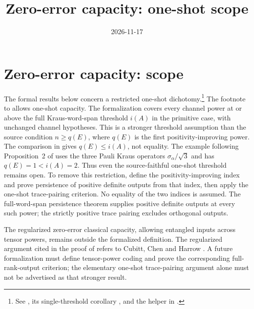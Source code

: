 \documentclass{article}
\title{Zero-error capacity: one-shot scope}
\author{}
\date{2026-11-17}
\begin{document}
\maketitle
{}

\section{Zero-error capacity: scope}
The formal results below concern a restricted one-shot dichotomy.\footnote{See
, its single-threshold corollary
, and the helper
 in
.}
The footnote to \cite[Theorem~2]{Sanz2010Quantum} allows one-shot capacity. The formalization
covers every channel power at or above the full Kraus-word-span threshold
$i(A)$ in the primitive case, with unchanged channel hypotheses. This is
a stronger threshold assumption than the source condition $n\ge q(E)$,
where $q(E)$ is the first positivity-improving power.
The comparison in \cite[Proposition~1]{Sanz2010Quantum} gives
$q(E)\le i(A)$, not equality. The example following Proposition~2 of \cite{Sanz2010Quantum} uses
the three Pauli Kraus operators $\sigma_\alpha/\sqrt{3}$ and has
$q(E)=1<i(A)=2$. Thus even the source-faithful one-shot threshold remains open.
To remove this restriction, define the positivity-improving index and prove
persistence of positive definite outputs from that index, then apply the
one-shot trace-pairing criterion. No equality of the two indices is assumed.
The full-word-span persistence theorem supplies
positive definite outputs at every such power; the strictly positive
trace pairing excludes orthogonal outputs.

The regularized zero-error classical capacity, allowing entangled inputs
across tensor powers, remains outside the formalized definition.
The regularized argument cited in the proof of
\cite[Theorem~2]{Sanz2010Quantum} refers to Cubitt, Chen and Harrow
\cite{Cubitt2009Superactivation}. A future formalization must
define tensor-power coding and prove the corresponding full-rank-output
criterion; the elementary one-shot trace-pairing argument alone must not
be advertised as that stronger result.



\end{document}
